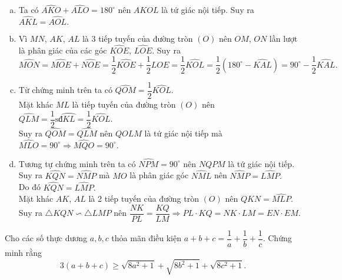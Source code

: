 \begin{ex}
{\begin{center}
		\end{center}
		\begin{enumerate}[a)]
			\item Ta có $\widehat{AKO}+\widehat{ALO}=180^{\circ}$ nên $AKOL$ là tứ giác nội tiếp.
			Suy ra $\widehat{AKL}=\widehat{AOL}.$
			\item Vì $MN$, $AK$, $AL$ là 3 tiếp tuyến của đường tròn $(O)$ nên $OM$, $ON$ lần lượt là phân giác của các góc $\widehat{KOE}$, $\widehat{LOE}$.
			Suy ra	\[\widehat{MON}=\widehat{MOE}+\widehat{NOE}=\dfrac{1}{2}\widehat{KOE}+\dfrac{1}{2}\widehat{LOE}=\dfrac{1}{2}\widehat{KOL}=\dfrac{1}{2}(180^{\circ}-\widehat{KAL})=90^{\circ}-\dfrac{1}{2}\widehat{KAL}.\]
			\item 
			Từ chứng minh trên ta có $\widehat{QOM}=\dfrac{1}{2}\widehat{KOL}$.\\
			Mặt khác $ML$ là tiếp tuyến của đường tròn $(O)$ nên $\widehat{QLM}=\dfrac{1}{2}\text{sđ}\wideparen{KL}=\dfrac{1}{2}\widehat{KOL}.$\\
			Suy ra $\widehat{QOM}=\widehat{QLM}$ nên $QOLM$ là tứ giác nội tiếp mà $\widehat{MLO}=90^{\circ}\Rightarrow \widehat{MQO}=90^{\circ}.$
			\item Tương tự chứng minh trên ta có $\widehat{NPM}=90^{\circ}$ nên $NQPM$ là tứ giác nội tiếp.\\
			Suy ra $\widehat{KQN}=\widehat{NMP}$ mà $MO$ là phân giác góc $\widehat{NML}$ nên $\widehat{NMP}=\widehat{LMP}.$\\
			Do đó $\widehat{KQN}=\widehat{LMP}.$\\
			Mặt khác $AK$, $AL$ là 2 tiếp tuyến của đường tròn $(O)$ nên $\widehat{QKN}=\widehat{MLP}$.\\
			Suy ra $\triangle KQN \backsim \triangle LMP$ nên $\dfrac{NK}{PL}=\dfrac{KQ}{LM} \Rightarrow PL\cdot KQ=NK\cdot LM=EN\cdot EM$.
		\end{enumerate}
	}
\end{ex}
\begin{ex}%
	Cho các số thực dương $a,b,c$ thỏa mãn điều kiện $a+b+c=\dfrac{1}{a}+\dfrac{1}{b}+\dfrac{1}{c}$. Chứng minh rằng
	\[3(a+b+c)\geq \sqrt{8a^2+1}+\sqrt{8b^2+1}+\sqrt{8c^2+1}.\]
\end{ex} 
